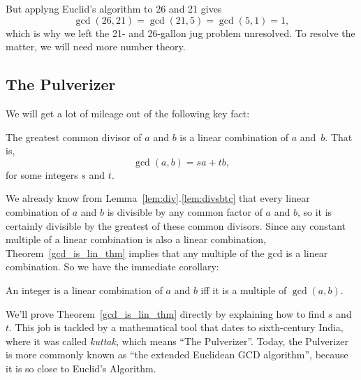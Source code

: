 But applyng Euclid's algorithm to 26 and 21 gives
\[
\gcd(26, 21) = \gcd(21, 5) = \gcd(5, 1) = 1,
\]
which is why we left the 21- and 26-gallon jug problem unresolved.  To
resolve the matter, we will need more number theory.

\subsection{The Pulverizer}\label{sec:pulverizer}
We will get a lot of mileage out of the following key fact:
\begin{theorem}\label{gcd_is_lin_thm}
The greatest common divisor of $a$ and $b$ is a linear combination of
$a$ and~$b$.  That is,
\[
\gcd(a, b)  =  s a + t b,
\]
for some integers $s$ and $t$.
\end{theorem}

We already know from Lemma~\ref{lem:div}.\ref{lem:divsbtc} that every
linear combination of $a$ and $b$ is divisible by any common factor of
$a$ and $b$, so it is certainly divisible by the greatest of these
common divisors.  Since any constant multiple of a linear combination
is also a linear combination, Theorem~\ref{gcd_is_lin_thm} implies that
any multiple of the gcd is a linear combination.  So we have the
immediate corollary:
\begin{corollary}\label{cor:lin-comb}
An integer is a linear combination of $a$ and $b$ iff it is a multiple of
$\gcd(a, b)$.
\end{corollary}

We'll prove Theorem~\ref{gcd_is_lin_thm} directly by explaining how to
find $s$ and $t$.  This job is tackled by a mathematical tool that
dates to sixth-century India, where it was called \emph{kuttak}, which
means ``The Pulverizer''.  Today, the Pulverizer is more commonly
known as ``the extended Euclidean GCD algorithm'', because it is so
close to Euclid's Algorithm.

